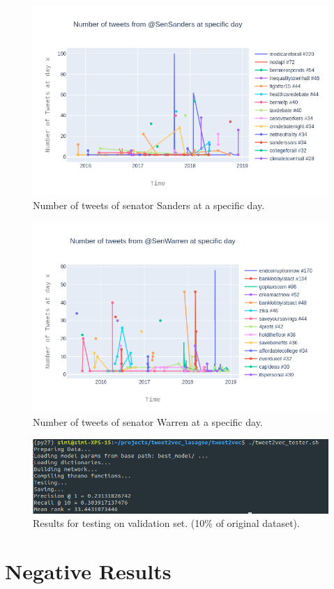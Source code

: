 \documentclass[10pt,conference,compsocconf]{IEEEtran}
\begin{document}
\begin{figure}
	\centering
	\includegraphics[width=0.7\linewidth]{images/tweets_of_sensanders_overtime}
	\caption{Number of tweets of senator Sanders at a specific day.}
	\label{fig:tweetsSanders}
\end{figure}
\begin{figure}
	\centering
	\includegraphics[width=0.7\linewidth]{images/tweets_of_senwarren_overtime}
	\caption{Number of tweets of senator Warren at a specific day.}
	\label{fig:tweetsWarren}
\end{figure}

\begin{figure}
	\centering
	\includegraphics[width=0.7\linewidth]{images/tweet2vec_training}
	\caption{Results for testing on validation set. (10\% of original dataset).}
	\label{fig:tweet2vectraining}
\end{figure}

\section{Negative Results}
\end{document}
